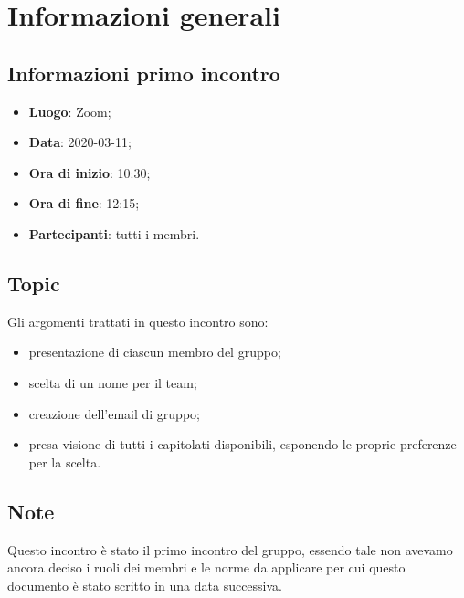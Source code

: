 \section{Informazioni generali}
\subsection{Informazioni primo incontro}
\begin{itemize}
\item \textbf{Luogo}: Zoom\glo;
\item \textbf{Data}: 2020-03-11;
\item \textbf{Ora di inizio}: 10:30;
\item \textbf{Ora di fine}: 12:15;
\item \textbf{Partecipanti}: tutti i membri.
\end{itemize}

\subsection{Topic}
Gli argomenti trattati in questo incontro sono:
\begin{itemize}
	\item presentazione di ciascun membro del gruppo;
	\item scelta di un nome per il team;
	\item creazione dell'email di gruppo;
	\item presa visione di tutti i capitolati disponibili, esponendo le proprie preferenze per la scelta.
\end{itemize}

\subsection{Note}
Questo incontro è stato il primo incontro del gruppo, essendo tale non avevamo ancora deciso i ruoli dei membri e le norme da applicare per cui questo documento è stato scritto in una data successiva.